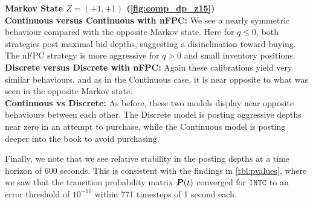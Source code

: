 {\bf Markov State $Z=(+1,+1)$ (\autoref{fig:comp_dp_z15})}\\
{\bf Continuous versus Continuous with nFPC:} We see a nearly symmetric behaviour compared with the opposite Markov state. Here for $q \leq 0$, both strategies post maximal bid depths, suggesting a disinclination toward buying. The nFPC strategy is more aggressive for $q>0$ and small inventory positions.\\
{\bf Discrete versus Discrete with nFPC:} Again these calibrations yield very similar behaviours, and as in the Continuous case, it is near opposite to what was seen in the opposite Markov state.\\
{\bf Continuous vs Discrete:} As before, these two models display near opposite behaviours between each other. The Discrete model is posting aggressive depths near zero in an attempt to purchase, while the Continuous model is posting deeper into the book to avoid purchasing.

Finally, we note that we see relative stability in the posting depths at a time horizon of 600 seconds. This is consistent with the findings in \autoref{tbl:pvalues}, where we saw that the transition probability matrix $\boldsymbol{P}(t)$ converged for $\texttt{INTC}$ to an error threshold of $10^{-10}$ within 771 timesteps of 1 second each.

